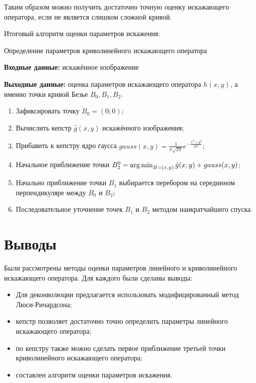 Таким образом можно получить достаточно точную оценку искажающего оператора, если не является слишком сложной кривой.

Итоговый алгоритм оценки параметров искажения:

\begin{algorithm} Определение параметров криволинейного искажающего оператора
	
	\textbf{Входные данные:} искажённое изображение

	\textbf{Выходные данные:} оценка параметров искажающего оператора $h(x,y)$, а именно точки кривой Безье $B_0, B_1, B_2$.
	\begin{enumerate}
		\item Зафиксировать точку $B_0 = (0;0)$;
		\item Вычислить кепстр $\hat{g}(x,y)$ искажённого изображения;
		\item Прибавить к кепстру ядро гаусса $gauss(x,y) = \frac{1}{\sigma\sqrt{2\pi}}e^{-\frac{x^2+y^2}{2\sigma^2}}$;
		\item Начальное приближение точки $B_2^0 = \operatorname*{arg\,min}_{B=(x,y)} \hat{g}(x,y) + gauss(x,y)$;
		\item Начально приближение точки $B_1$ выбирается перебором на серединном перпендикуляре между $B_0$ и $B_2$;
		\item Последовательное уточнение точек $B_1$ и $B_2$ методом наикратчайшего спуска. 
	\end{enumerate}
	\label{algo:curve}
\end{algorithm}

\section{Выводы}
Были рассмотрены методы оценки параметров линейного и криволинейного искажающего оператора. Для каждого были сделаны выводы:
\begin{itemize}
	\item Для деконволюции предлагается использовать модифицированный метод Люси-Ричардсона;
	\item кепстр позволяет достаточно точно определить параметры линейного искажающего оператора;
	\item по кепстру также можно сделать первое приближение третьей точки криволинейного искажающего оператора;
	\item составлен алгоритм оценки параметров искажения.
\end{itemize}